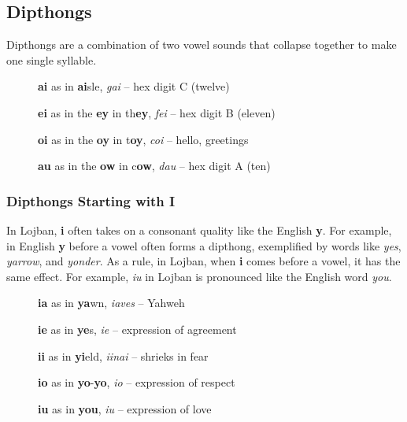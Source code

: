 \documentclass[12pt]{book}
\begin{document}

\subsection{Dipthongs}

Dipthongs are a combination of two vowel sounds that collapse together to make one single syllable. 

\begin{description}
\item[ ] \textbf{ai} as in \textbf{ai}sle, \emph{gai} -- hex digit C (twelve)
\item[ ] \textbf{ei} as in the \textbf{ey} in th\textbf{ey}, \emph{fei} -- hex digit B (eleven)
\item[ ] \textbf{oi} as in the \textbf{oy} in t\textbf{oy}, \emph{coi} -- hello, greetings
\item[ ] \textbf{au} as in the \textbf{ow} in c\textbf{ow}, \emph{dau} -- hex digit A (ten)
\end{description}



\subsubsection{Dipthongs Starting with I}

In Lojban, \textbf{i} often takes on a consonant quality like the English \textbf{y}. For example, in English \textbf{y} before a vowel often forms a dipthong, exemplified by words like \emph{yes}, \emph{yarrow}, and \emph{yonder}. As a rule, in Lojban, when \textbf{i} comes before a vowel, it has the same effect. For example, \emph{iu} in Lojban is pronounced like the English word \emph{you}. 

\begin{description}
\item[ ] \textbf{ia} as in \textbf{ya}wn, \emph{iaves} -- Yahweh
\item[ ] \textbf{ie} as in \textbf{ye}s, \emph{ie} -- expression of agreement
\item[ ] \textbf{ii} as in \textbf{yi}eld, \emph{iinai} -- shrieks in fear
\item[ ] \textbf{io} as in \textbf{yo}-\textbf{yo}, \emph{io} -- expression of respect
\item[ ] \textbf{iu} as in \textbf{you}, \emph{iu} -- expression of love
\end{description}
\end{document}
